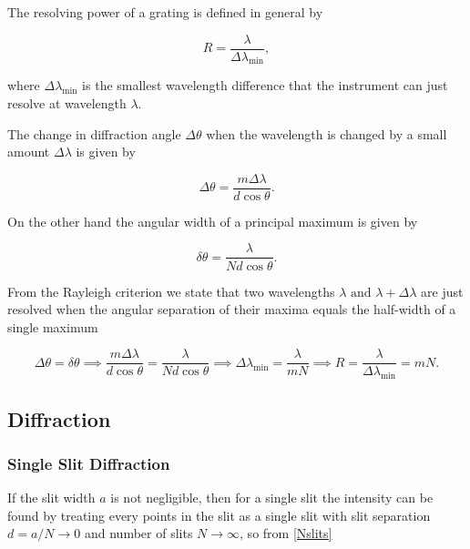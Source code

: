 \documentclass[english,a4paper,12pt]{report}
\begin{document}
The resolving power of a grating is defined in general by 

\begin{equation}
    R = \frac{\lambda }{\Delta \lambda _{\text{min} } },
\end{equation}

where \(\Delta \lambda _{\text{min} } \) is the smallest wavelength difference that the instrument can just resolve at wavelength \(\lambda \).  

The change in diffraction angle \(\Delta \theta \) when the wavelength is changed by a small amount \(\Delta \lambda \) is given by 

\begin{equation}
    \Delta \theta = \frac{m \Delta \lambda }{d \cos \theta }. 
\end{equation}

On the other hand the angular width of a principal maximum is given by 

\begin{equation}
    \delta \theta = \frac{\lambda }{Nd \cos \theta }. 
\end{equation}

From the Rayleigh criterion we state that two wavelengths \(\lambda \text { and } \lambda +\Delta \lambda \) are just resolved when the angular separation of their maxima equals the half-width of a single maximum

\begin{equation}
    \Delta \theta = \delta \theta \implies \frac{m \Delta \lambda }{d \cos \theta } = \frac{\lambda }{Nd \cos \theta } \implies \Delta \lambda _{\text{min} } = \frac{\lambda }{mN} \implies R = \frac{\lambda }{\Delta \lambda _{\text{min} } }     = mN.
\end{equation}




\subsection{Diffraction}

\subsubsection{Single Slit Diffraction}

If the slit width \(a\) is not negligible, then for a single slit the intensity can be found by treating every points in the slit as a single slit with slit separation \(d = a /N \to 0\) and number of slits \(N \to \infty\), so from \cref{Nslits} 
\end{document}
